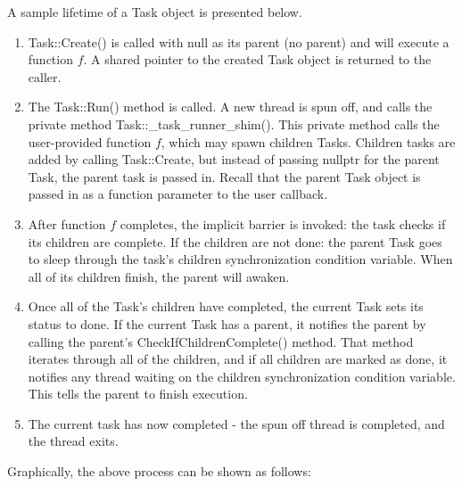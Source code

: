 \documentclass[11pt]{article}
\begin{document}
                
                A sample lifetime of a Task object is presented below. 
                \begin{enumerate}
                    \item Task::Create() is called with null as its parent (no parent) and will execute
                        a function $f$. A shared pointer to the created Task object is returned to the caller.

                    \item The Task::Run() method is called. A new thread is spun off, and calls the private
                        method Task::\_task\_runner\_shim(). This private method calls the user-provided
                        function $f$, which may spawn children Tasks. Children tasks are added by calling
                        Task::Create, but instead of passing nullptr for the parent Task, the parent task is passed
                        in. Recall that the parent Task object is passed in as a function parameter to the user
                        callback.
                        
                    \item After function $f$ completes, the implicit barrier is invoked: the task
                        checks if its children are complete. If the children are not done: the parent Task goes to
                        sleep through the task's children synchronization condition variable. When all of its children 
                        finish, the parent will awaken.
                        
                    \item Once all of the Task's children have completed, the current Task sets its status
                        to done. If the current Task has a parent, it notifies the parent by calling the
                        parent's CheckIfChildrenComplete() method. That method iterates through all of the children,
                        and if all children are marked as done, it notifies any thread waiting on the children
                        synchronization condition variable. This tells the parent to finish execution.
                        
                    \item The current task has now completed - the spun off thread is completed, and the thread exits.
                \end{enumerate}
            
                Graphically, the above process can be shown as follows:
            
\end{document}
